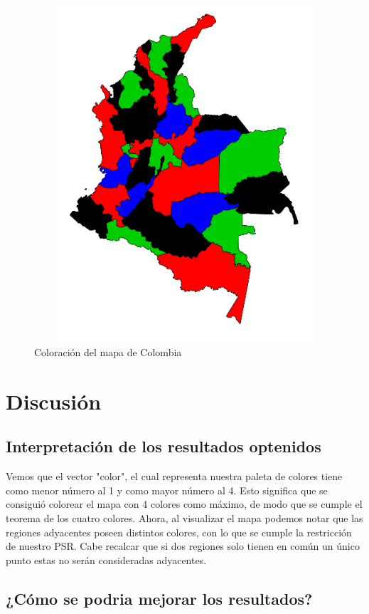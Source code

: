\documentclass[a4paper]{article}
\begin{document}
\begin{figure}
	\centering
	\includegraphics[width=14.5cm,height=12.5cm]{Colombia.png}
	\caption{Coloración del mapa de Colombia}
	\label{FI2_1}
\end{figure}

\pagebreak
\section{Discusi\'on}
\subsection{Interpretaci\'on de los resultados optenidos}

Vemos que el vector "color", el cual representa nuestra paleta de colores tiene como menor número al 1 y como mayor número al 4. Esto significa que se consiguió colorear el mapa con 4 colores como máximo, de modo que se cumple el teorema de los cuatro colores. Ahora, al visualizar el mapa podemos notar que las regiones adyacentes poseen distintos colores, con lo que se cumple la restricción de nuestro PSR. Cabe recalcar que si dos regiones solo tienen en común un único punto estas no serán consideradas adyacentes.


\subsection{¿C\'omo se podria mejorar los resultados?}
\end{document}
